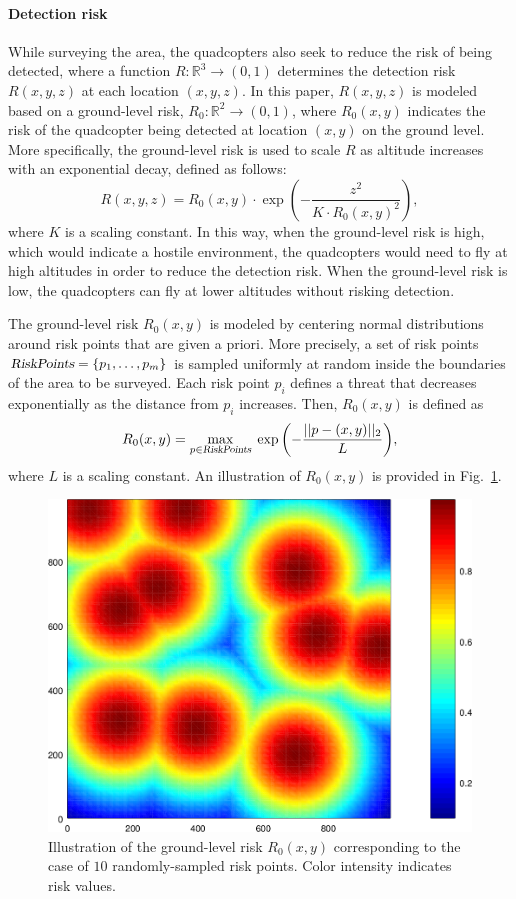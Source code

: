 \documentclass[letterpaper, 10pt, conference]{ieeeconf}
\newcommand{\Var}[1]{\ensuremath{{{\textsl{#1}}}}}
\newcommand{\R}{\ensuremath{\mathbb{R}}}
\newcommand{\Max}[1]{\underset{#1}{\operatorname{max}}\;}
\begin{document}
\paragraph{Detection risk}
\label{sec:Risk}


While surveying the area, the quadcopters also seek to reduce the risk
of being detected, where a function $R : \R^3 \rightarrow (0, 1)$ determines the
detection risk $R(x, y, z)$ at each location $(x, y, z)$.
In this paper, $R(x, y, z)$ is modeled based on a ground-level risk,
$R_0 : \R^2 \rightarrow (0, 1)$, where $R_0(x, y)$ indicates the risk
of the quadcopter being detected at location $(x, y)$ on the ground
level. More specifically, the ground-level risk is used to scale $R$
as altitude increases with an exponential decay, defined as follows:
$$
 R(x, y, z) = R_0(x, y) \cdot \exp{\left(-\frac{z^2}{K \cdot R_0(x, y)^2}\right)},
$$
where $K$ is a scaling constant. In this way, when the ground-level risk is
high, which would indicate a hostile environment, the quadcopters
would need to fly at high altitudes in order to reduce the
detection risk. When the ground-level risk is low, the quadcopters can
fly at lower altitudes without risking detection.

The ground-level risk $R_0(x, y)$ is modeled by centering normal
distributions around risk points that are given a priori. More
precisely, a set of risk points $\Var{RiskPoints} = \{p_1, \ldots,
p_m\}$ is sampled uniformly at random inside the boundaries of the
area to be surveyed. Each risk point $p_i$ defines a threat that
decreases exponentially as the distance from $p_i$ increases. Then,
$R_0(x, y)$ is defined as
$$ R_0(x, y) = \Max{p \in \Var{RiskPoints}}
\exp{\left(-\frac{||p - (x, y)||_2}{L}\right)},
$$
where $L$ is a scaling constant.
An illustration of $R_0(x, y)$ is provided in Fig.~\ref{fig:Heatmap}.
\begin{figure}[h]
\centering
\includegraphics[width=0.8\columnwidth]{usef/heatmap.png}
\caption{Illustration of the ground-level risk $R_0(x, y)$
  corresponding to the case of $10$ randomly-sampled risk
  points. Color intensity indicates risk values.}
\label{fig:Heatmap}
\end{figure}
\end{document}
